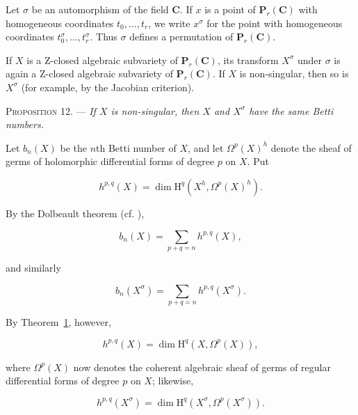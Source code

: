 

Let $\sigma$ be an automorphism of the field $\mathbf{C}$. If $x$ is a point of
$\mathbf{P}_r(\mathbf{C})$ with homogeneous coordinates $t_0,\ldots,t_r$, we
write $x^\sigma$ for the point with homogeneous coordinates
$t_0^\sigma,\ldots,t_r^\sigma$. Thus $\sigma$ defines a permutation of
$\mathbf{P}_r(\mathbf{C})$.

If $X$ is a Z-closed algebraic subvariety of $\mathbf{P}_r(\mathbf{C})$, its
transform $X^\sigma$ under $\sigma$ is again a Z-closed algebraic subvariety of
$\mathbf{P}_r(\mathbf{C})$. If $X$ is non-singular, then so is $X^\sigma$ (for
example, by the Jacobian criterion).

\textsc{Proposition 12}. --- \emph{If $X$ is
non-singular, then $X$ and $X^\sigma$ have the same Betti numbers.}

Let $b_n(X)$ be the $n$th Betti number of $X$, and let $\Omega^p(X)^h$ denote
the sheaf of germs of holomorphic differential forms of degree $p$ on $X$.
Put

\begin{equation*}
h^{p,q}(X)=\dim\mathrm{H}^q(X^h,\Omega^p(X)^h).
\end{equation*}

By the Dolbeault theorem (cf. ),

\begin{equation*}
b_n(X)=\sum_{p+q=n}h^{p,q}(X),
\end{equation*}

and similarly

\begin{equation*}
b_n(X^\sigma)=\sum_{p+q=n}h^{p,q}(X^\sigma).
\end{equation*}

By Theorem~\hyperref[gaga:thm:1]{1}, however,

\begin{equation*}
h^{p,q}(X)=\dim\mathrm{H}^q(X,\Omega^p(X)),
\end{equation*}

where $\Omega^p(X)$ now denotes the coherent algebraic sheaf of germs of
regular differential forms of degree $p$ on $X$; likewise,

\begin{equation*}
h^{p,q}(X^\sigma)=
\dim\mathrm{H}^q(X^\sigma,\Omega^p(X^\sigma)).
\end{equation*}

